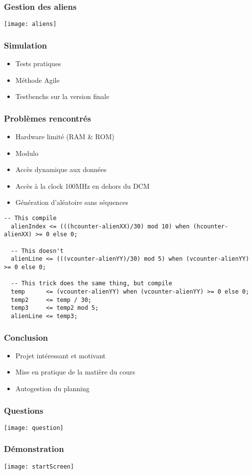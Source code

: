 \documentclass[serif,mathserif, french]{beamer}
\begin{document}
\begin{frame}
  \frametitle{Gestion des aliens}
  \begin{center}
      \texttt{[image: aliens]}
      \end{center}
\end{frame}

\begin{frame}
  \frametitle{Simulation}
  \begin{itemize}
  \item Tests pratiques
  \item Méthode Agile
  \item Testbenchs sur la version finale
  \end{itemize}
\end{frame}

\begin{frame}[fragile]
  \frametitle{Problèmes rencontrés}
  \begin{itemize}
  \item Hardware limité (RAM \& ROM)
  \item Modulo
  \item Accès dynamique aux données
  \item Accès à la clock 100MHz en dehors du DCM
  \item Génération d'aléatoire sans séquences
  \end{itemize}
  
  \begin{lstlisting}[frame=single, basicstyle=\tiny]
  -- This compile
  alienIndex <= (((hcounter-alienXX)/30) mod 10) when (hcounter-alienXX) >= 0 else 0;
  
  -- This doesn't
  alienLine <= (((vcounter-alienYY)/30) mod 5) when (vcounter-alienYY) >= 0 else 0;
  
  -- This trick does the same thing, but compile
  temp      <= (vcounter-alienYY) when (vcounter-alienYY) >= 0 else 0;
  temp2     <= temp / 30;
  temp3     <= temp2 mod 5;
  alienLine <= temp3;
  \end{lstlisting}
\end{frame}

\begin{frame}
  \frametitle{Conclusion}
  \begin{itemize}
  \item Projet intéressant et motivant
  \item Mise en pratique de la matière du cours
  \item Autogestion du planning 
  \end{itemize}
\end{frame}

\begin{frame}
  \frametitle{Questions}
      \begin{center}
      \texttt{[image: question]}
      \end{center}
\end{frame}

\begin{frame}
  \frametitle{Démonstration}
    \begin{center}
      \texttt{[image: startScreen]}
      \end{center}
\end{frame}
\end{document}
